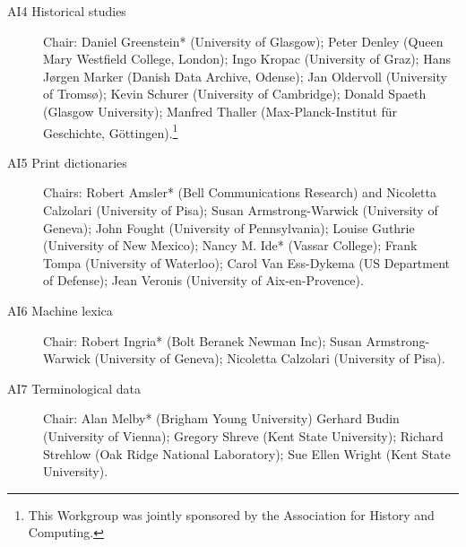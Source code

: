 \begin{description}
\item[{AI4 Historical studies}]Chair: Daniel Greenstein* (University of Glasgow); Peter Denley (Queen Mary Westfield College, London); Ingo Kropac (University of Graz); Hans Jørgen Marker (Danish Data Archive, Odense); Jan Oldervoll (University of Tromsø); Kevin Schurer (University of Cambridge); Donald Spaeth (Glasgow University); Manfred Thaller (Max-Planck-Institut für Geschichte, Göttingen).\footnote{This Workgroup was jointly sponsored by the Association for History and Computing.}
\item[{AI5 Print dictionaries}]Chairs: Robert Amsler* (Bell Communications Research) and Nicoletta Calzolari (University of Pisa); Susan Armstrong-Warwick (University of Geneva); John Fought (University of Pennsylvania); Louise Guthrie (University of New Mexico); Nancy M. Ide* (Vassar College); Frank Tompa (University of Waterloo); Carol Van Ess-Dykema (US Department of Defense); Jean Veronis (University of Aix-en-Provence).
\item[{AI6 Machine lexica}]Chair: Robert Ingria* (Bolt Beranek Newman Inc); Susan Armstrong-Warwick (University of Geneva); Nicoletta Calzolari (University of Pisa).
\item[{AI7 Terminological data}]Chair: Alan Melby* (Brigham Young University) Gerhard Budin (University of Vienna); Gregory Shreve (Kent State University); Richard Strehlow (Oak Ridge National Laboratory); Sue Ellen Wright (Kent State University).
\end{description} 
